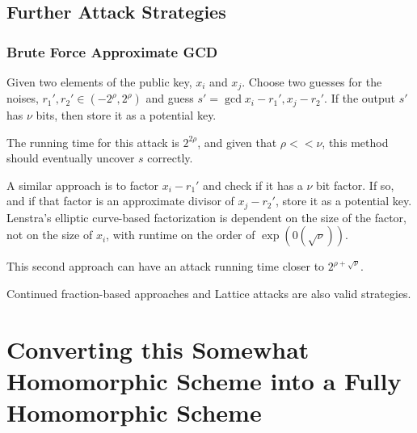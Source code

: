 \documentclass[a4paper,11pt, oneside]{article}
\begin{document}
\subsection{Further Attack Strategies}

\subsubsection{Brute Force Approximate GCD}

Given two elements of the public key, $x_i$ and $x_j$.  Choose two guesses for the noises, $r_1',r_2'\in (-2^\rho,2^\rho)$ and guess $s' = \gcd{x_i - r_1', x_j - r_2'}$.  If the output $s'$ has $\nu$ bits, then store it as a potential key.

The running time for this attack is $2^{2\rho}$, and given that $\rho << \nu$, this method should eventually uncover $s$ correctly.

A similar approach is to factor $x_i - r_1'$ and check if it has a $\nu$ bit factor.  If so, and if that factor is an approximate divisor of $x_j - r_2'$, store it as a potential key.  Lenstra's elliptic curve-based factorization is dependent on the size of the factor, not on the size of $x_i$, with runtime on the order of $\exp(\mathcal{0}(\sqrt{\nu}))$.

This second approach can have an attack running time closer to $2^{\rho + \sqrt{\nu}}$.

Continued fraction-based approaches and Lattice attacks are also valid strategies.

\section{Converting this Somewhat Homomorphic Scheme into a Fully Homomorphic Scheme}
\end{document}
